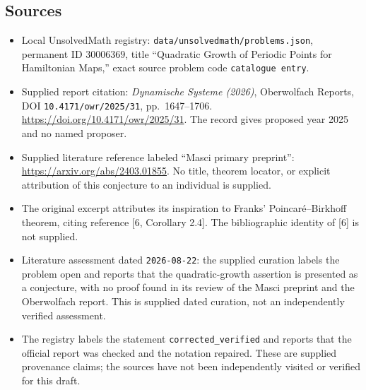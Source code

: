 \documentclass[11pt]{article}
\begin{document}
\subsection{Sources}
\begin{itemize}
\item Local UnsolvedMath registry: \texttt{data/unsolvedmath/problems.json}, permanent ID \(30006369\), title ``Quadratic Growth of Periodic Points for Hamiltonian Maps,'' exact source problem code \texttt{catalogue entry}.
\item Supplied report citation: \emph{Dynamische Systeme (2026)}, Oberwolfach Reports, DOI \texttt{10.4171/owr/2025/31}, pp.\ 1647--1706. \url{https://doi.org/10.4171/owr/2025/31}. The record gives proposed year 2025 and no named proposer.
\item Supplied literature reference labeled ``Masci primary preprint'': \url{https://arxiv.org/abs/2403.01855}. No title, theorem locator, or explicit attribution of this conjecture to an individual is supplied.
\item The original excerpt attributes its inspiration to Franks' Poincar\'e--Birkhoff theorem, citing reference [6, Corollary 2.4]. The bibliographic identity of [6] is not supplied.
\item Literature assessment dated \texttt{2026-08-22}: the supplied curation labels the problem open and reports that the quadratic-growth assertion is presented as a conjecture, with no proof found in its review of the Masci preprint and the Oberwolfach report. This is supplied dated curation, not an independently verified assessment.
\item The registry labels the statement \texttt{corrected\_verified} and reports that the official report was checked and the notation repaired. These are supplied provenance claims; the sources have not been independently visited or verified for this draft.
\end{itemize}
\end{document}
